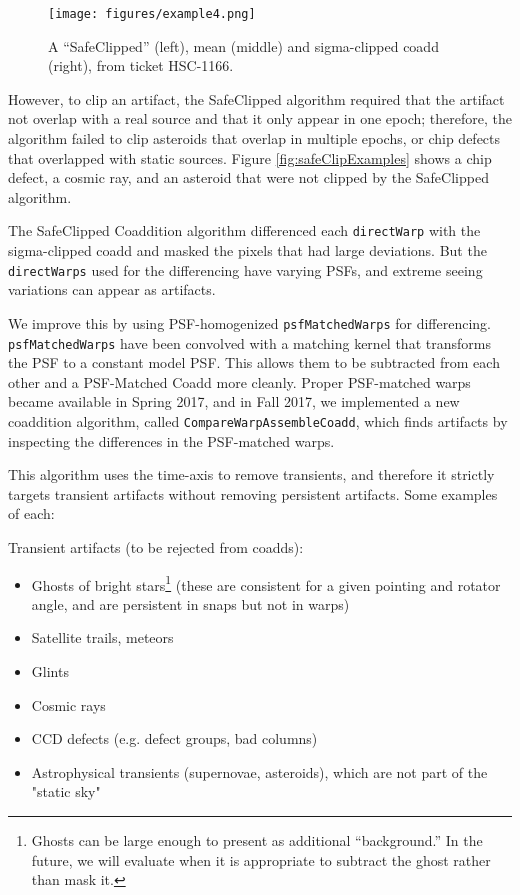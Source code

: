 \documentclass[DM,authoryear,toc]{lsstdoc}
\begin{document}
\begin{figure}
\begin{centering}
\texttt{[image: figures/example4.png]}
\par\end{centering}
\caption{A ``SafeClipped'' (left), mean (middle) and sigma-clipped coadd (right), from ticket HSC-1166. \label{fig:safeclip}}
\end{figure}

However, to clip an artifact, the SafeClipped algorithm required that the artifact not overlap with a real source and that it only appear in one epoch; therefore, the algorithm failed to clip asteroids that overlap in multiple epochs, or chip defects that overlapped with static sources.
Figure  \ref{fig:safeClipExamples} shows a chip defect, a cosmic ray, and an asteroid that were not clipped by the SafeClipped algorithm.

The SafeClipped Coaddition algorithm differenced each \texttt{directWarp} with the sigma-clipped coadd and masked the pixels that had large deviations.
But the \texttt{directWarps} used for the differencing have varying PSFs, and extreme seeing variations can appear as artifacts.

We improve this by using PSF-homogenized \texttt{psfMatchedWarps} for differencing.
\texttt{psfMatchedWarps} have been convolved with a matching kernel that transforms the PSF to a constant model PSF.
This allows them to be subtracted from each other and a PSF-Matched Coadd more cleanly.
Proper PSF-matched warps became available in Spring 2017, and in Fall 2017, we implemented a new coaddition algorithm, called \texttt{CompareWarpAssembleCoadd}, which finds artifacts by inspecting the differences in the PSF-matched warps.

This algorithm uses the time-axis to remove transients, and therefore it strictly targets transient artifacts without removing persistent artifacts.  Some examples of each:

Transient artifacts (to be rejected from coadds):
\begin{itemize}
\item Ghosts of bright stars\footnote{Ghosts can be large enough to present as additional ``background.'' In the future, we will evaluate when it is appropriate to subtract the ghost rather than mask it.} (these are consistent for a given pointing and rotator angle, and are persistent in snaps but not in warps)
\item Satellite trails, meteors
\item Glints
\item Cosmic rays
\item CCD defects (e.g. defect groups, bad columns)
\item Astrophysical transients (supernovae, asteroids), which are not part of the "static sky"
\end{itemize}
\end{document}
